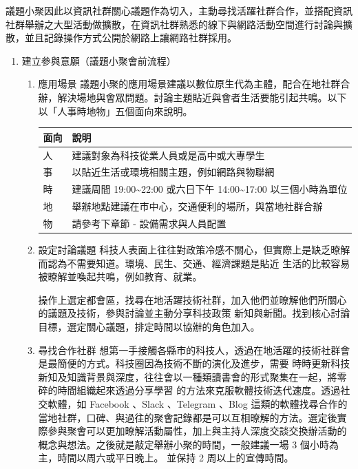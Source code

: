 \documentclass[12pt,a4paper]{article}
\begin{document}
議題小聚因此以資訊社群關心議題作為切入，主動尋找活躍社群合作，並搭配資訊社群舉辦之大型活動做擴散，在資訊社群熟悉的線下與網路活動空間進行討論與擴散，並且記錄操作方式公開於網路上讓網路社群採用。
\begin{enumerate}
\item 建立參與意願（議題小聚會前流程）
\label{sec:orga0676ec}
\begin{enumerate}
\item 應用場景
\label{sec:orgf100e9f}
議題小聚的應用場景建議以數位原生代為主體，配合在地社群合辦，解決場地與會眾問題。討論主題貼近與會者生活要能引起共鳴。以下以「人事時地物」五個面向來說明。

\begin{center}
\label{tab:org6d9c22b}
\begin{tabular}{ll}
\toprule
面向 & 說明\\
\midrule
人 & 建議對象為科技從業人員或是高中或大專學生\\
事 & 以貼近生活或環境相關主題，例如網路與物聯網\\
時 & 建議周間 19:00\textasciitilde{}22:00 或六日下午 14:00\textasciitilde{}17:00 以三個小時為單位\\
地 & 舉辦地點建議在市中心，交通便利的場所，與當地社群合辦\\
物 & 請參考下章節 - 設備需求與人員配置\\
\bottomrule
\end{tabular}
\end{center}
\item 設定討論議題
\label{sec:orgba76eb7}
科技人表面上往往對政策冷感不關心，但實際上是缺乏暸解而認為不需要知道。環境、民生、交通、經濟課題是貼近
生活的比較容易被暸解並喚起共鳴，例如教育、就業。

操作上選定都會區，找尋在地活躍技術社群，加入他們並暸解他們所關心的議題及技術，參與討論並主動分享科技政策
新知與新聞。找到核心討論目標，選定關心議題，排定時間以協辦的角色加入。
\item 尋找合作社群
\label{sec:org1a0c0f0}
想第一手接觸各縣市的科技人，透過在地活躍的技術社群會是最簡便的方式。科技圈因為技術不斷的演化及進步，需要
時時更新科技新知及知識背景與深度，往往會以一種類讀書會的形式聚集在一起，將零碎的時間組織起來透過分享學習
的方法來克服軟體技術迭代速度。透過社交軟體，如 Facebook 、Slack 、Telegram 、Blog 這類的軟體找尋合作的當地社群，口碑、與過往的聚會記錄都是可以互相暸解的方法。選定後實際參與聚會可以更加暸解活動屬性，加上與主持人深度交談交換辦活動的概念與想法。之後就是敲定舉辦小聚的時間，一般建議一場 3 個小時為主，時間以周六或平日晚上。
並保持 2 周以上的宣傳時間。


\end{enumerate}
\end{enumerate}
\end{document}
